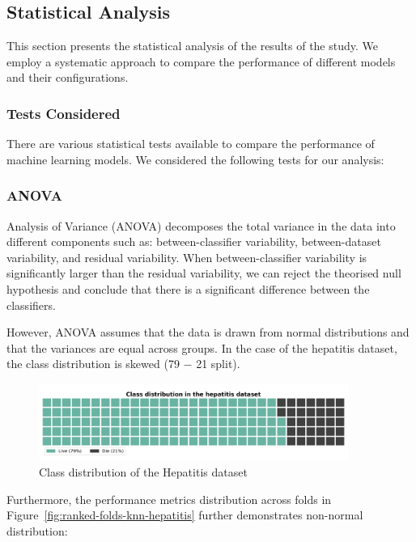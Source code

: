\subsection{Statistical Analysis}
\label{sec:statistical-analysis}

This section presents the statistical analysis of the results of the study.
We employ a systematic approach to compare the performance of different models and their configurations.

\subsubsection*{Tests Considered}
There are various statistical tests available to compare the performance of machine learning models.
We considered the following tests for our analysis:

\subsubsection{ANOVA}
Analysis of Variance (ANOVA) decomposes the total variance in the data into different components such as:
between-classifier variability, between-dataset variability, and residual variability. When between-classifier
variability is significantly larger than the residual variability, we can reject the theorised null hypothesis and
conclude that there is a significant difference between the classifiers.

However, ANOVA assumes that the data is drawn from normal distributions and that the variances are equal across groups.
In the case of the hepatitis dataset, the class distribution is skewed (79 $-$ 21 split)\cite{StatisticalComparisonsOfClassifiersOverMultipleDataSetsJML}.

\begin{figure}[!ht]
    \centering
    \includegraphics[width=0.9\textwidth]{figures/hepatitis-class-distribution.png}
    \caption{Class distribution of the Hepatitis dataset}
\label{fig:class-distribution-hepatitis}
\end{figure}

Furthermore, the performance metrics distribution across folds in Figure~\ref{fig:ranked-folds-knn-hepatitis} further demonstrates non-normal distribution:

